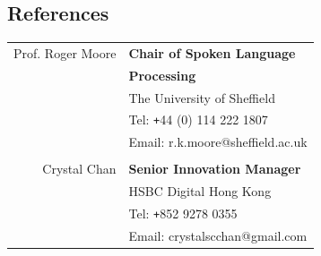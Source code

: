 \documentclass[10pt]{article} %
\begin{document}
\begin{changemargin}{0pt}{0.5pt}
\begin{minipage}[t]{0.44\textwidth}


\section{References}

\begin{tabular}{rl}
	Prof. Roger Moore	 & \textbf{Chair of Spoken Language}\\ &\textbf{Processing}\\
	& The University of Sheffield\\ &Tel: \texttt{+}44 (0) 114 222 1807 \\ &Email: r.k.moore@sheffield.ac.uk \\ \\
	
	
	Crystal Chan	 & \textbf{Senior Innovation Manager}\\
	& HSBC Digital Hong Kong\\ & Tel: \texttt{+}852 9278 0355\\ & Email: crystalscchan@gmail.com
\end{tabular}\\[10pt]


\end{minipage} %

\end{changemargin}
\end{document}
